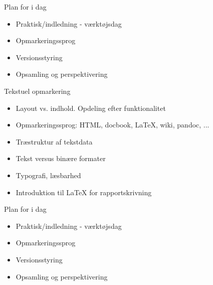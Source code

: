 \documentclass[a4paper,landscape]{slides}
\begin{document}
\begin{slide}
	\begin{center} {\large 
            Plan for i dag
	} \end{center}
	\begin{itemize} \addtolength{\itemsep}{-\baselineskip}
            \item Praktisk/indledning - værktøjsdag
            \item Opmarkeringssprog
            \item Versionsstyring
            \item Opsamling og perspektivering
	\end{itemize}
\end{slide}

\begin{slide}
	\begin{center} {\large 
        Tekstuel opmarkering
	} \end{center}
	\begin{itemize} \addtolength{\itemsep}{-\baselineskip}
              \item Layout vs. indhold. Opdeling efter funktionalitet
              \item Opmarkeringssprog: HTML, docbook, LaTeX, wiki, pandoc, ...
              \item Træstruktur af tekstdata
              \item Tekst versus binære formater
              \item Typografi, læsbarhed
              \item Introduktion til LaTeX for rapportskrivning
	\end{itemize}
\end{slide}

\begin{slide}
	\begin{center} {\large 
            Plan for i dag
	} \end{center}
	\begin{itemize} \addtolength{\itemsep}{-\baselineskip}
            \item Praktisk/indledning - værktøjsdag
            \item Opmarkeringssprog
            \item Versionsstyring
            \item Opsamling og perspektivering
	\end{itemize}
\end{slide}
\end{document}
